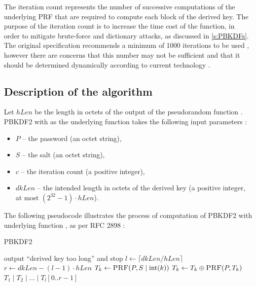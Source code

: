 \documentclass[12pt,oneside]{fithesis2}
\begin{document}
      The iteration count represents the number of successive computations of the underlying PRF that are required to compute each block of the derived key. The purpose of the iteration count is to increase the time cost of the function, in order to mitigate brute-force and dictionary attacks, as discussed in \ref{s:PBKDFs}. The original specification recommends a minimum of 1000 iterations to be used \cite[section 4.2]{rfc2898}, however there are concerns that this number may not be sufficient and that it should be determined dynamically according to current technology \cite[chapter 7]{Durmuth} \cite[footnotes 7, 8]{luks}.
      
      \subsection{Description of the algorithm}
      Let $hLen$ be the length in octets of the output of the pseudorandom function . PBKDF2 with  as the underlying function takes the following input parameters \cite{rfc2898}:
      \begin{itemize}
        \item $P$ -- the password (an octet string),
        \item $S$ -- the salt (an octet string),
        \item $c$ -- the iteration count (a positive integer),
        \item $dkLen$ -- the intended length in octets of the derived key (a positive integer, at most $(2^{32} - 1) \cdot hLen$).
      \end{itemize}
      
      The following pseudocode illustrates the process of computation of PBKDF2 with underlying function , as per RFC 2898 \cite{rfc2898}:
      \begin{algorithm}[H]
        \caption{PBKDF2}
        \begin{algorithmic}[1]
              \State output ``derived key too long'' and
         stop
            \EndIf
            \State $l \gets \lceil dkLen / hLen\rceil$ 
            \State $r \gets dkLen - (l - 1) \cdot hLen$ 
              \State $T_k \gets \Call{PRF}{P, S \mid \operatorname{int}(k)}$
                \State $T_k \gets T_k \oplus \Call{PRF}{P, T_k}$
              \EndFor
            \EndFor
            \State \Return $T_1 \mid T_2 \mid ... \mid T_l[0..r - 1]$
          \EndFunction
        \end{algorithmic}
      \end{algorithm}
      
\end{document}
